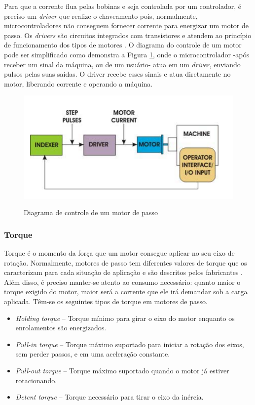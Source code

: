 Para que a corrente flua pelas bobinas e seja controlada por um controlador, é preciso um \textit{driver} que realize o chaveamento pois, normalmente, microcontroladores não conseguem fornecer corrente para energizar um motor de passo. Os \textit{drivers} são circuitos integrados com transistores e atendem ao princípio de funcionamento dos tipos de motores \cite{man:advancedmicrosystemStepControl}. O diagrama do controle de um motor pode ser simplificado como demonstra a Figura \ref{fig:connectionstepper}, onde o microcontrolador -após receber um sinal da máquina, ou de um usuário- atua em um \textit{driver}, enviando pulsos pelas suas saídas. O driver recebe esses sinais e atua diretamente no motor, liberando corrente e operando a máquina.

\begin{figure}[!htb]
	\centering
	\caption{Diagrama de controle de um motor de passo}
	\includegraphics[width=.7\linewidth]{figuras/connectionstepper}
	\label{fig:connectionstepper}
\end{figure}

\subsubsection{Torque}

Torque é o momento da força que um motor consegue aplicar no seu eixo de rotação. Normalmente, motores de passo tem diferentes valores de torque que os caracterizam para cada situação de aplicação e são descritos pelos fabricantes \cite{manual:stepperMicrochip}. Além disso, é preciso manter-se atento ao consumo necessário: quanto maior o torque exigido do motor, maior será a corrente que ele irá demandar sob a carga aplicada. Têm-se os seguintes tipos de torque em motores de passo. 

\begin{itemize} %
	\item \textit{Holding torque} – Torque mínimo para girar o eixo do motor enquanto os enrolamentos são energizados.
	\item \textit{Pull-in torque} – Torque máximo suportado para iniciar a rotação dos eixos, sem perder passos, e em uma aceleração constante.
	\item \textit{Pull-out torque} – Torque máximo suportado quando o motor já estiver rotacionando.
	\item \textit{Detent torque} – Torque necessário para tirar o eixo da inércia.
\end{itemize}

